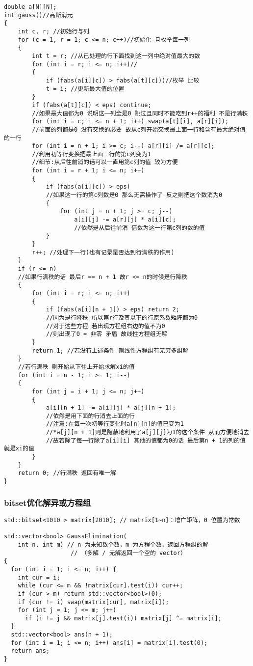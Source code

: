 \documentclass[a4paper, fontset=none]{ctexart}
\begin{document}
\begin{verbatim}
double a[N][N];
int gauss()//高斯消元
{
    int c, r; //初始行与列
    for (c = 1, r = 1; c <= n; c++)//初始化 且枚举每一列
    {
        int t = r; //从已处理的行下面找到这一列中绝对值最大的数
        for (int i = r; i <= n; i++)//
        {
            if (fabs(a[i][c]) > fabs(a[t][c]))//枚举 比较
            t = i; //更新最大值的位置
        }
        if (fabs(a[t][c]) < eps) continue;
        //如果最大值都为0 说明这一列全是0 跳过且同时不能吃到r++的福利 不是行满秩
        for (int i = c; i <= n + 1; i++) swap(a[t][i], a[r][i]);
        //前面的列都是0 没有交换的必要 故从c列开始交换最上面一行和含有最大绝对值的一行
        for (int i = n + 1; i >= c; i--) a[r][i] /= a[r][c];
        //利用初等行变换把最上面一行的第c列变为1
        //细节:从后往前消的话可以一直用第c列的值 较为方便
        for (int i = r + 1; i <= n; i++)
        {
            if (fabs(a[i][c]) > eps)
            //如果这一行的第c列数是0 那么无需操作了 反之则把这个数消为0
            {
                for (int j = n + 1; j >= c; j--)
                    a[i][j] -= a[r][j] * a[i][c];
                    //依然是从后往前消 倍数为这一行第c列的数的值
            }
        }
        r++; //处理下一行(也有记录是否达到行满秩的作用)
    }
    if (r <= n)
    //如果行满秩的话 最后r == n + 1 故r <= n的时候是行降秩
    {
        for (int i = r; i <= n; i++)
        {
            if (fabs(a[i][n + 1]) > eps) return 2;
            //因为是行降秩 所以第r行及其以下的行原系数矩阵都为0
            //对于这些方程 若出现方程组右边的值不为0
            //则出现了0 = 非零 矛盾 故线性方程组无解
        }
        return 1; //若没有上述条件 则线性方程组有无穷多组解
    }
    //若行满秩 则开始从下往上开始求解xi的值
    for (int i = n - 1; i >= 1; i--)
    {
        for (int j = i + 1; j <= n; j++)
        {
            a[i][n + 1] -= a[i][j] * a[j][n + 1];
            //依然是用下面的行消去上面的行
            //注意:在每一次初等行变化时a[n][n]的值已变为1
            //*a[j][n + 1]则是隐蔽地利用了a[j][j]为1的这个条件 从而方便地消去
            //故若除了每一行除了a[i][i] 其他的值都为0的话 最后第n + 1的列的值就是xi的值
        }
    }
    return 0; //行满秩 返回有唯一解
}
\end{verbatim}
\subsubsection{bitset优化解异或方程组}

\begin{verbatim}
std::bitset<1010 > matrix[2010]; // matrix[1~n]：增广矩阵，0 位置为常数

std::vector<bool> GaussElimination(
    int n, int m) // n 为未知数个数，m 为方程个数，返回方程组的解
                   // （多解 / 无解返回一个空的 vector）
{
  for (int i = 1; i <= n; i++) {
    int cur = i;
    while (cur <= m && !matrix[cur].test(i)) cur++;
    if (cur > m) return std::vector<bool>(0);
    if (cur != i) swap(matrix[cur], matrix[i]);
    for (int j = 1; j <= m; j++)
      if (i != j && matrix[j].test(i)) matrix[j] ^= matrix[i];
  }
  std::vector<bool> ans(n + 1);
  for (int i = 1; i <= n; i++) ans[i] = matrix[i].test(0);
  return ans;
}
\end{verbatim}
\end{document}
